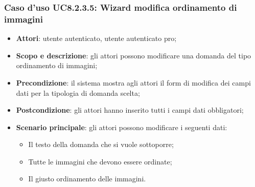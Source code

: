 \subsubsection{Caso d’uso UC8.2.3.5: Wizard modifica ordinamento di immagini}
\begin{itemize}
	\item\textbf{Attori}: utente autenticato, utente autenticato pro;
	\item\textbf{Scopo e descrizione}: gli attori possono modificare una domanda del tipo ordinamento di immagini;
	\item\textbf{Precondizione}: il sistema mostra agli attori il form di modifica dei campi dati per la tipologia di domanda scelta; 
	\item \textbf{Postcondizione}: gli attori hanno inserito tutti i campi dati obbligatori;
	\item\textbf{Scenario principale}: gli attori possono modificare i seguenti dati:
	\begin{itemize}
		\item Il testo della domanda che si vuole sottoporre;
		\item Tutte le immagini che devono essere ordinate;
		\item Il giusto ordinamento delle immagini.
	\end{itemize}
\end{itemize}
